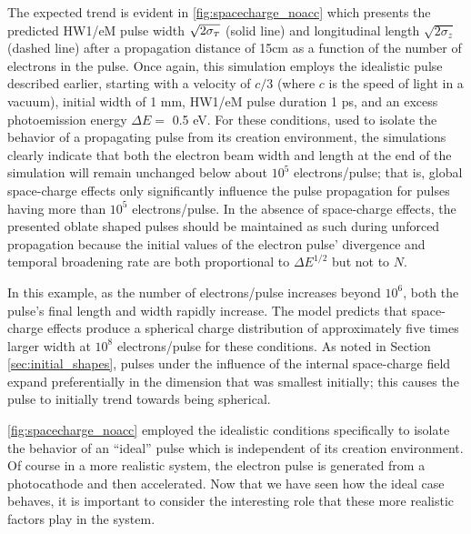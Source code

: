 The expected trend is evident in \ref{fig:spacecharge_noacc} which presents the predicted HW1/eM pulse width $\sqrt{2 \sigma_{{\scriptscriptstyle T}}}$ (solid line) and longitudinal length $\sqrt{2 \sigma_{z}}$ (dashed line) after a propagation distance of 15cm as a function of the number of electrons in the pulse.
Once again, this simulation employs the idealistic pulse described earlier, starting with a velocity of $c/3$ (where $c$ is the speed of light in a vacuum), initial width of 1 mm, HW1/eM pulse duration 1 ps, and an excess photoemission energy $\Delta E = $ 0.5 eV.
For these conditions, used to isolate the behavior of a propagating pulse from its creation environment, the simulations clearly indicate that both the electron beam width and length at the end of the simulation will remain unchanged below about $10^5$ electrons/pulse; that is, global space-charge effects only significantly influence the pulse propagation for pulses having more than $10^5$ electrons/pulse.
In the absence of space-charge effects, the presented oblate shaped pulses should be maintained as such during unforced propagation because the initial values of the electron pulse' divergence and temporal broadening rate are both proportional to $\Delta E^{1/2}$ but not to $N$.


In this example, as the number of electrons/pulse increases beyond $10^6$, both the pulse's final length and width rapidly increase.
The model predicts that space-charge effects produce a spherical charge distribution of approximately five times larger width at $10^8$ electrons/pulse for these conditions.
As noted in Section \ref{sec:initial_shapes}, pulses under the influence of the internal space-charge field expand preferentially in the dimension that was smallest initially; this causes the pulse to initially trend towards being spherical.

\ref{fig:spacecharge_noacc} employed the idealistic conditions specifically to isolate the behavior of an ``ideal'' pulse which is independent of its creation environment.
Of course in a more realistic system, the electron pulse is generated from a photocathode and then accelerated.
Now that we have seen how the ideal case behaves, it is important to consider the interesting role that these more realistic factors play in the system.


